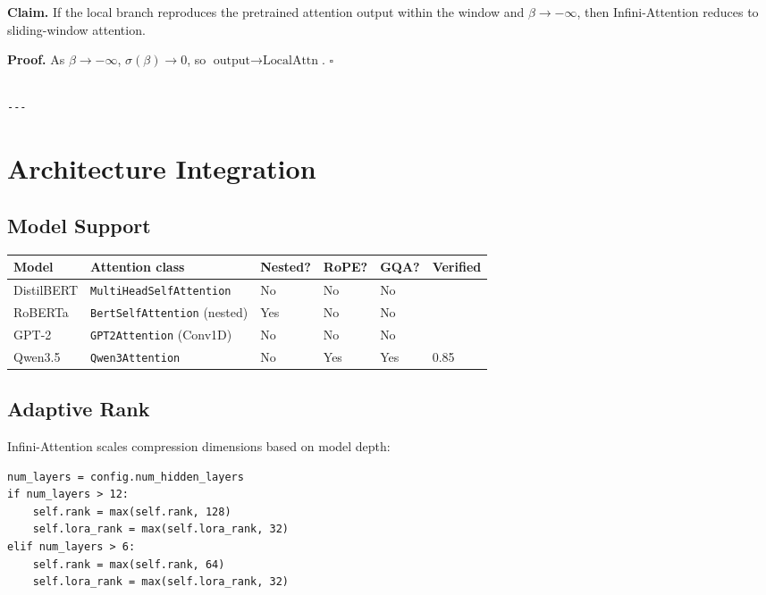 \textbf{Claim.} If the local branch reproduces the pretrained attention output 
within the window and $\beta \to -\infty$, then Infini-Attention reduces to 
sliding-window attention.

\textbf{Proof.} As $\beta \to -\infty$, $\sigma(\beta) \to 0$, so 
$\text{output} \to \text{LocalAttn}$. $\square$
\begin{lstlisting}

---
\end{lstlisting}


\section{Architecture Integration}

\subsection{Model Support}

\begin{table}[H]
\centering
\small
\begin{tabular}{llllll}
\toprule
\textbf{Model} & \textbf{Attention class} & \textbf{Nested?} & \textbf{RoPE?} & \textbf{GQA?} & \textbf{Verified} \\
\midrule
DistilBERT & \texttt{MultiHeadSelfAttention} & No & No & No &  \\
RoBERTa & \texttt{BertSelfAttention} (nested) & Yes & No & No &  \\
GPT-2 & \texttt{GPT2Attention} (Conv1D) & No & No & No &  \\
Qwen3.5 & \texttt{Qwen3Attention} & No & Yes & Yes & 0.85 \\
\bottomrule
\end{tabular}
\end{table}

\subsection{Adaptive Rank}

Infini-Attention scales compression dimensions based on model depth:

\begin{lstlisting}
num_layers = config.num_hidden_layers
if num_layers > 12:
    self.rank = max(self.rank, 128)
    self.lora_rank = max(self.lora_rank, 32)
elif num_layers > 6:
    self.rank = max(self.rank, 64)
    self.lora_rank = max(self.lora_rank, 32)
\end{lstlisting}


